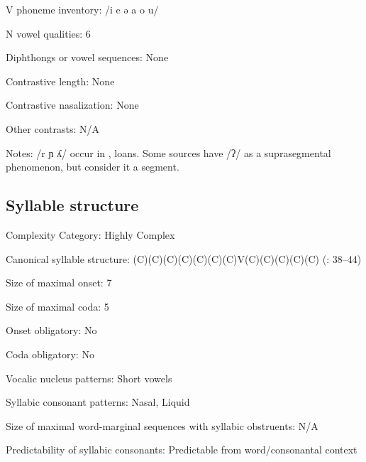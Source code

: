 {\begin{appendixdesc}
\item[V phoneme inventory:] /i e ə a o u/

\item[N vowel qualities:] 6

\item[Diphthongs or vowel sequences:] None

\item[Contrastive length:] None

\item[Contrastive nasalization:] None

\item[Other contrasts:] N/A

\item[Notes:] /r ɲ ʎ/ occur in ,  loans. Some sources have /ʔ/ as a suprasegmental phenomenon, but \citet{GeorgVolodin1999} consider it a segment. 
\end{appendixdesc}
\subsection*{Syllable structure}
\begin{appendixdesc}

\item[Complexity Category:] Highly Complex

\item[Canonical syllable structure:] (C)(C)(C)(C)(C)(C)(C)V(C)(C)(C)(C)(C) (\citealt{GeorgVolodin1999}: 38--44)

\item[Size of maximal onset:] 7

\item[Size of maximal coda:] 5

\item[Onset obligatory:] No

\item[Coda obligatory:] No

\item[Vocalic nucleus patterns:] Short vowels

\item[Syllabic consonant patterns:] Nasal, Liquid

\item[Size of maximal word-marginal sequences with syllabic obstruents:] N/A

\item[Predictability of syllabic consonants:] Predictable from word/consonantal context


\end{appendixdesc}}
